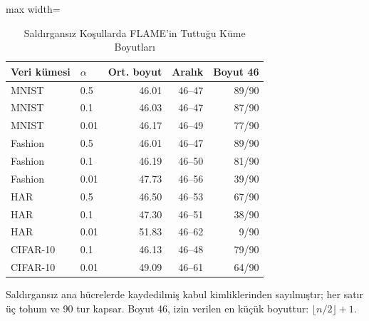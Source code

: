 \begin{table}[!t]
\centering\footnotesize
\setlength{\tabcolsep}{4pt}
\caption{Saldırgansız Koşullarda FLAME'in Tuttuğu Küme Boyutları}\label{tab:flame_sizes}
\begin{adjustbox}{max width=\columnwidth}
\begin{tabular}{llrrr}
\toprule
Veri kümesi & $\alpha$ & Ort. boyut & Aralık & Boyut 46 \\
\midrule
MNIST & 0.5 & 46.01 & 46--47 & 89/90 \\
MNIST & 0.1 & 46.03 & 46--47 & 87/90 \\
MNIST & 0.01 & 46.17 & 46--49 & 77/90 \\
Fashion & 0.5 & 46.01 & 46--47 & 89/90 \\
Fashion & 0.1 & 46.19 & 46--50 & 81/90 \\
Fashion & 0.01 & 47.73 & 46--56 & 39/90 \\
HAR & 0.5 & 46.50 & 46--53 & 67/90 \\
HAR & 0.1 & 47.30 & 46--51 & 38/90 \\
HAR & 0.01 & 51.83 & 46--62 & 9/90 \\
CIFAR-10 & 0.1 & 46.13 & 46--48 & 79/90 \\
CIFAR-10 & 0.01 & 49.09 & 46--61 & 64/90 \\
\bottomrule
\end{tabular}
\end{adjustbox}

\par\vspace{3pt}\parbox{\linewidth}{\footnotesize Saldırgansız ana hücrelerde kaydedilmiş kabul kimliklerinden sayılmıştır; her satır üç tohum ve 90 tur kapsar. Boyut 46, izin verilen en küçük boyuttur: $\lfloor n/2\rfloor+1$.}
\end{table}
